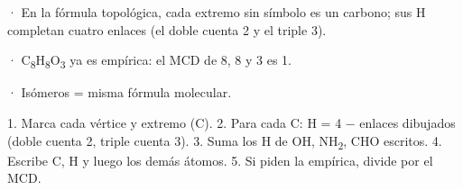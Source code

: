 \begin{clave}[{Recuerda}] · En la fórmula topológica, cada extremo sin símbolo es un carbono; sus H completan cuatro enlaces (el doble cuenta 2 y el triple 3).\par · C\textsubscript{8}H\textsubscript{8}O\textsubscript{3} ya es empírica: el MCD de 8, 8 y 3 es 1.\par · Isómeros = misma fórmula molecular.\end{clave}
  
\begin{clave} 1. Marca cada vértice y extremo (C). 2. Para cada C: H = 4 \ensuremath{-} enlaces dibujados (doble cuenta 2, triple cuenta 3). 3. Suma los H de OH, NH\textsubscript{2}, CHO escritos. 4. Escribe C, H y luego los demás átomos. 5. Si piden la empírica, divide por el MCD.\end{clave}
